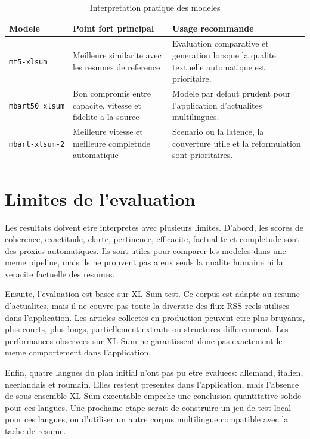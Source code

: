 \begin{table}[t]
\caption{Interpretation pratique des modeles}
\label{tab:analyse-model-choice}
\centering
\begin{tabular}{|p{2.8cm}|p{4.7cm}|p{4.7cm}|}
\hline
\textbf{Modele} & \textbf{Point fort principal} & \textbf{Usage recommande} \\
\hline
\texttt{mt5-\allowbreak xlsum} & Meilleure similarite avec les resumes de reference & Evaluation comparative et generation lorsque la qualite textuelle automatique est prioritaire. \\
\hline
\texttt{mbart50\_\allowbreak xlsum} & Bon compromis entre capacite, vitesse et fidelite a la source & Modele par defaut prudent pour l'application d'actualites multilingues. \\
\hline
\texttt{mbart-\allowbreak xlsum-2} & Meilleure vitesse et meilleure completude automatique & Scenario ou la latence, la couverture utile et la reformulation sont prioritaires. \\
\hline
\end{tabular}
\end{table}

\section{Limites de l'evaluation}

Les resultats doivent etre interpretes avec plusieurs limites. D'abord, les scores de coherence, exactitude, clarte, pertinence, efficacite, factualite et completude sont des proxies automatiques. Ils sont utiles pour comparer les modeles dans une meme pipeline, mais ils ne prouvent pas a eux seuls la qualite humaine ni la veracite factuelle des resumes.

Ensuite, l'evaluation est basee sur XL-Sum test. Ce corpus est adapte au resume d'actualites, mais il ne couvre pas toute la diversite des flux RSS reels utilises dans l'application. Les articles collectes en production peuvent etre plus bruyants, plus courts, plus longs, partiellement extraits ou structures differemment. Les performances observees sur XL-Sum ne garantissent donc pas exactement le meme comportement dans l'application.

Enfin, quatre langues du plan initial n'ont pas pu etre evaluees: allemand, italien, neerlandais et roumain. Elles restent presentes dans l'application, mais l'absence de sous-ensemble XL-Sum executable empeche une conclusion quantitative solide pour ces langues. Une prochaine etape serait de construire un jeu de test local pour ces langues, ou d'utiliser un autre corpus multilingue compatible avec la tache de resume.

